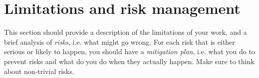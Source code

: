 \documentclass[12pt,a4paper,twoside]{article}
\begin{document}
\section{Limitations and risk management}
\label{sec:risks}
This section should provide a description of the limitations of your
work, and a brief analysis of \textit{risks}, i.e. what might go wrong. For each risk that
is either serious or likely to happen, you should have a \textit{mitigation plan}, i.e.
what you do to prevent risks and what do you do when they actually happen.
Make sure to think about non-trivial risks.


\setlength{\bibsep}{4pt}



\appendix
\newpage

\end{document}
